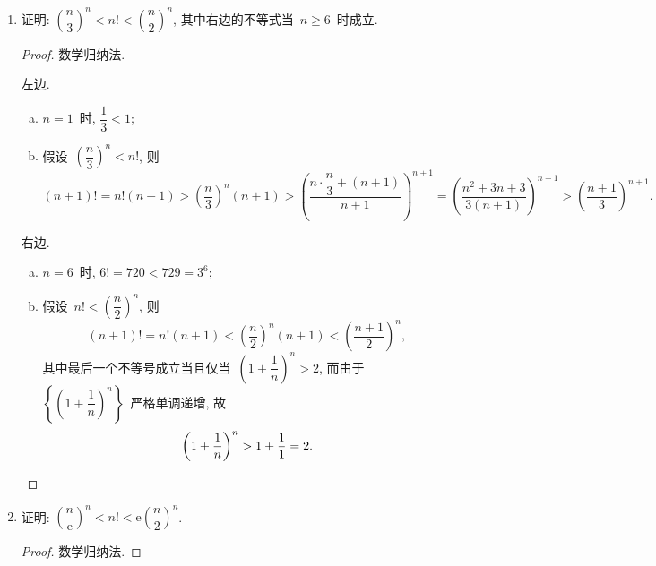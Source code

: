 \documentclass[UTF8,a4paper,11pt,twoside]{book}
\newcommand{\e}{\mathrm e}
\begin{document}
\begin{enumerate}
\begin{proof}
\begin{enumerate}[(1)]
\begin{enumerate}[(a)]
				            \item 若~$a_n<a_{n+2}, \forall n>N$. 则~$\{a_{2n-1}\}, \{a_{2n}\}$~收敛, 设其极限分别为~$\alpha,\beta$, 则显然~$\alpha,\beta>0$. 故~$\lim\limits_{n\to\infty} \dfrac{a_n}{a_{n+1}+a_{n+2}}=\lim\limits_{n\to\infty} \dfrac{a_{2n}}{a_{2n+1}+a_{2n+2}}=\dfrac{\beta}{\alpha+\beta}>0$.
			            \end{enumerate}
			            均与~$\lim\limits_{n\to\infty} \dfrac{a_n}{a_{n+1}+a_{n+2}}=0$~矛盾. \qedhere
		      \end{enumerate}
	      \end{proof}

	\item 证明: $\left(\dfrac{n}{3}\right)^n<n!<\left(\dfrac{n}{2}\right)^n$, 其中右边的不等式当~$n\geqslant 6$~时成立.
	      \begin{proof}
		      数学归纳法.

		      左边.
		      \begin{enumerate}[(a)]
			      \item $n=1$~时, $\dfrac{1}{3}<1$;
			      \item 假设~$\left(\dfrac{n}{3}\right)^n<n!$, 则
			            \[
				            (n+1)!=n!(n+1)>\left(\dfrac{n}{3}\right)^n(n+1)>\left(\dfrac{n\cdot\dfrac{n}{3}+(n+1)}{n+1}\right)^{n+1}=\left(\dfrac{n^2+3n+3}{3(n+1)}\right)^{n+1}>\left(\dfrac{n+1}{3}\right)^{n+1}.
			            \]
		      \end{enumerate}

		      右边.
		      \begin{enumerate}[(a)]
			      \item $n=6$~时, $6!=720<729=3^6$;
			      \item 假设~$n!<\left(\dfrac{n}{2}\right)^n$, 则
			            \[
				            (n+1)!=n!(n+1)<\left(\dfrac{n}{2}\right)^n(n+1)<\left(\dfrac{n+1}{2}\right)^n,
			            \]
			            其中最后一个不等号成立当且仅当~$\left(1+\dfrac{1}{n}\right)^n>2$, 而由于~$\left\{\left(1+\dfrac{1}{n}\right)^n\right\}$~严格单调递增, 故
			            \[
				            \left(1+\dfrac{1}{n}\right)^n>1+\dfrac{1}{1}=2.\qedhere
			            \]
		      \end{enumerate}
	      \end{proof}

	\item 证明: $\left(\dfrac{n}{\e}\right)^n<n!<\e\left(\dfrac{n}{2}\right)^n$.
	      \begin{proof}
		      数学归纳法.


\end{proof}
\end{enumerate}
\end{document}
